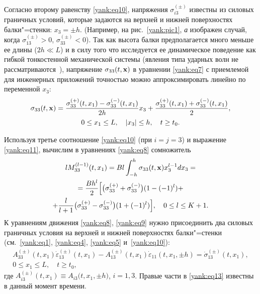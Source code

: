 Согласно второму равенству \eqref{yank:eq10}, напряжения $\sigma _{i3}^{(\pm )}$
известны из силовых граничных условий, которые задаются на верхней и нижней
поверхностях балки"=стенки: $x_3 =\pm h$. (Например, на рис.~\ref{yank:pic1}, {\sl а} изображен
случай, когда $\sigma _{13}^{(\pm )} >0$, $\sigma _{33}^{(\pm )} <0$). Так
как высота балки предполагается много меньше ее длины ($2h\ll L$) и в силу
того что исследуется ее динамическое поведение как гибкой тонкостенной
механической системы (явления типа ударных волн не рассматриваются~\cite{yank:bib13}),
напряжение $\sigma _{33} (t,{\bf x})$ в уравнении
\eqref{yank:eq7} с приемлемой для инженерных приложений точностью можно аппроксимировать
линейно по переменной $x_3$:
\begin{equation}
\label{yank:eq11}
\begin{array}{c}
\displaystyle 
\sigma _{33} (t,{\bf x})= \frac{\sigma _{33}^{(+)} (t,x_1)-\sigma _{33}^{(-)} (t,x_1 )}{2h}x_3 +\frac{\sigma _{33}^{(+)} (t,x_1)+\sigma _{33}^{(-)} (t,x_1)}{2}, \\[3mm]
 0\le x_1 \le L,\quad  |x_3 |\le h,\quad t\ge t_0.
\end{array}
\end{equation}

Используя третье соотношение \eqref{yank:eq10} (при $i=j=3$) и выражение \eqref{yank:eq11}, вычислим в
уравнениях \eqref{yank:eq8} сомножитель
\begin{multline}
\label{yank:eq12}
lM_{33}^{(l-1)} (t,x_1)=Bl\int _{-h}^h \sigma _{33}  (t,{\bf x} )x_3^{l-1} dx_3 
=\\
=\frac{Bh^l}{2}\Bigl[ \bigl(\sigma _{33}^{(+)} +\sigma _{33}^{(-)} \bigr)(1-(-1)^l ) + \\
 +\frac{l}{l+1} \bigl(\sigma _{33}^{(+)} -\sigma _{33}^{(-)} \bigr)(1+(-1)^l ) \Bigr],\quad 0\le
l\le K+1.
\end{multline}
К уравнениям движения \eqref{yank:eq8}, \eqref{yank:eq9} нужно присоединить два силовых граничных
условия на верхней и нижней поверхностях балки"=стенки (см.~\eqref{yank:eq1}, \eqref{yank:eq4}, \eqref{yank:eq5} и~\eqref{yank:eq10}):
\begin{equation}
\label{yank:eq13}
\begin{array}{c}
A_{33}^{(\pm )} (t,x_1)\dot {\varepsilon }_{13}^{(\pm )} (t,x_1) -A_{13}^{(\pm )} (t,x_1)\dot {\varepsilon }_{11} (t,x_1,\pm h )=\dot {\sigma }_{13}^{(\pm )} (t,x_1), \\[3mm]
0\le x_1 \le L,\quad t\ge t_0,
\end{array}
\end{equation}
где $A_{i3}^{(\pm )} (t,x_1)\equiv A_{i3} \big(
t,x_1,\pm h\big)$, $i=1,3$. Правые части в \eqref{yank:eq13} известны в
данный момент времени.

